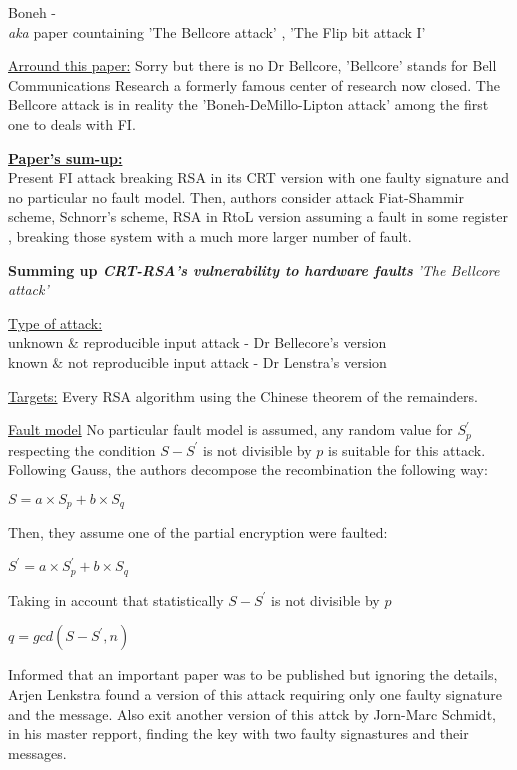 \item Boneh - \nocite{eurocrypt-1997} \\
\textit{aka} paper countaining 'The Bellcore attack' , 'The Flip bit attack I'

\underline{Arround this paper:}
Sorry but there is no Dr Bellcore, 'Bellcore' stands for 
Bell Communications Research a formerly famous center of research 
now closed. The Bellcore attack is in reality the 
'Boneh-DeMillo-Lipton attack' among the first one to deals with FI.

\underline{\textbf{Paper's sum-up:}}\\
Present FI attack breaking RSA in its CRT version with one faulty
signature and no particular no fault model.
Then, authors consider attack Fiat-Shammir scheme, Schnorr's scheme, 
RSA in RtoL version assuming a fault in some register , breaking those system 
with a much more larger number of fault.

\textbf{Summing up \textit{CRT-RSA's vulnerability to hardware faults}} 
\textit{'The Bellcore attack'}

\underline{Type of attack:}\\
unknown $\&$ reproducible input attack - Dr Bellecore's version\\
known $\&$ not reproducible input attack - Dr Lenstra's version

\underline{Targets:}
Every RSA algorithm using the Chinese theorem of the remainders.

\underline{Fault model}
No particular fault model is assumed, any random value for $S_{p}^{'}$
respecting the condition $S-S^{'}$ is not divisible by $p$ is suitable 
for this attack.
Following Gauss, the authors decompose the recombination the following way:
\begin{center}
$S = a \times S_p + b \times S_q $
\end{center}
Then, they assume one of the partial encryption were faulted:
\begin{center}
$S^{'} = a \times S_{p}^{'} + b \times S_{q} $
\end{center}
Taking in account that statistically $S-S^{'}$ is not divisible by $p$
\begin{center}
$q = gcd(S-S^{'}, n)$
\end{center}
Informed that an important paper was to be published but ignoring the details,
Arjen Lenkstra found a version of this attack requiring only one faulty signature
and the message. Also exit another version of this attck by Jorn-Marc Schmidt,
in his master repport, finding the key with two faulty signastures and their messages.


